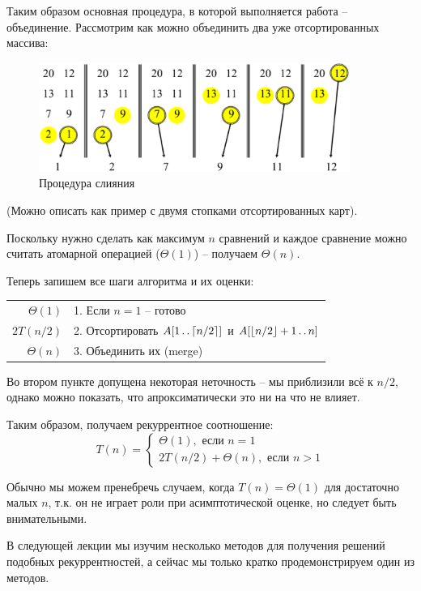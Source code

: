 \documentclass[a4paper,11pt]{article}
\begin{document}
Таким образом основная процедура, в которой выполняется работа -- объединение.
Рассмотрим как можно объединить два уже отсортированных массива:

\begin{figure}[ht]
  \centering
  \includegraphics[width=4in]{lecture1/merge.eps}
  \caption{Процедура слияния}
  \label{fig:merge}
\end{figure}

(Можно описать как пример с двумя стопками отсортированных карт).

Поскольку нужно сделать как максимум $n$ сравнений и каждое сравнение можно
считать атомарной операцией ($\Theta(1)$) -- получаем $\Theta(n)$.

Теперь запишем все шаги алгоритма и их оценки:

\begin{tabular}{|r|l|}
$\Theta(1)$    & 1. Если $n = 1$ -- готово  \\
$2T(n/2)$      & 2. Отсортировать $A[1 \mathinner{\ldotp\ldotp} \lceil n/2 \rceil]$ и $A[\lfloor
                    n/2 \rfloor+1 \mathinner{\ldotp\ldotp} n]$ \\
$\Theta(n)$    & 3. Объединить их (merge) 
\end{tabular}

Во втором пункте допущена некоторая неточность -- мы приблизили всё к $n/2$,
однако можно показать, что апроксиматически это ни на что не влияет.

Таким образом, получаем рекуррентное соотношение:
\begin{equation}
  T(n) = \begin{cases}
    \Theta(1), \text{ если } n = 1 \\
    2T(n/2) + \Theta(n), \text{ если } n > 1
    \end{cases}
  \label{eq:recur}
\end{equation}

Обычно мы можем пренебречь случаем, когда $T(n) = \Theta(1)$ для достаточно
малых $n$, т.к. он не играет роли при асимптотической оценке, но следует быть
внимательными.

В следующей лекции мы изучим несколько методов для получения решений подобных
рекуррентностей, а сейчас мы только кратко продемонстрируем один из методов.
\end{document}
